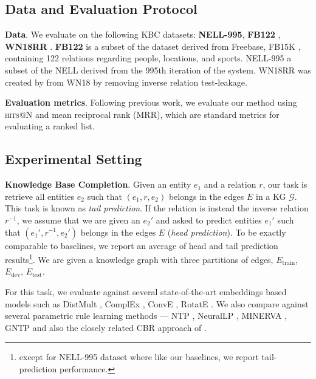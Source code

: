 \documentclass[11pt,a4paper]{article}
\newcommand{\nell}{NELL-995\xspace}
\newcommand{\ent}{\ensuremath{e}}
\newcommand{\rel}{\ensuremath{r}}
\begin{document}
\subsection{Data and Evaluation Protocol}
\label{sub:data_and_eval_protocols}

\textbf{Data}. We evaluate on the following KBC datasets: \textbf{NELL-995}, \textbf{FB122} \cite{guo2016jointly}, \textbf{WN18RR} \cite{dettmers2018convolutional}. \textbf{FB122} is a subset of the dataset derived from Freebase, FB15K \cite{bordes2013translating}, containing 122 relations regarding people, locations, and sports. {NELL-995} \cite{deeppath} a subset of the NELL derived from the 995th iteration of the system. WN18RR was created by \citet{dettmers2018convolutional} from WN18 by removing inverse relation test-leakage.


\textbf{Evaluation metrics}. Following previous work, we evaluate our method using \textsc{hits}@N and mean reciprocal rank (MRR), which are standard metrics for evaluating a ranked list.


\subsection{Experimental Setting}
\label{sub:experimental_setting}

\textbf{Knowledge Base Completion}. Given an entity $\ent_1$ and a relation $\rel$, our task is retrieve all entities $\ent_2$ such that $(\ent_1, \rel, \ent_2)$ belongs in the edges $E$ in a KG $\mathcal{G}$. This task is known as \emph{tail prediction}. If the relation is instead the inverse relation $\rel^{-1}$, we assume that we are given an  $\ent_2'$ and asked to predict entities $\ent_1'$ such that $(\ent_1', \rel^{-1}, \ent_2')$ belongs in the edges $E$ (\emph{head prediction}). To be exactly comparable to baselines, we report an average of head and tail prediction results\footnote{except for \nell dataset where like our baselines, we report tail-prediction performance.}. We are given a knowledge graph with three partitions of edges, $E_\text{train}$, $E_\text{dev}$, $E_\text{test}$.

For this task, we evaluate against several state-of-the-art embeddings based models such as 
DistMult \cite{distmul}, ComplEx \cite{trouillon2016complex}, ConvE \cite{dettmers2018convolutional}, RotatE \cite{sun2019rotate}. We also compare against several parametric rule learning methods --- 
NTP \cite{ntp}, NeuralLP \cite{yang2017differentiable}, MINERVA \cite{das2018go}, GNTP \citep{minervini2019differentiable} and also the closely related CBR approach of \citet{cbr}.
\end{document}

